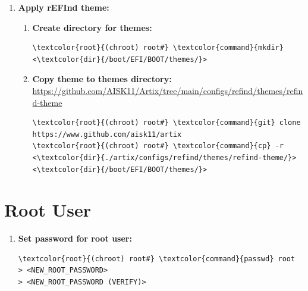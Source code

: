 \documentclass[10pt, a4paper, onecolumn, oneside, titlepage, openany]{book}
\begin{document}
\begin{enumerate}
\begin{Verbatim}[commandchars=\\\{\}]
menuentry "Artix" \{
    #volume  "ESP"
    icon    /EFI/BOOT/themes/refind-theme/icons/128-48/os_artix.png
    loader  /EFI/artix/vmlinuz-linux
    options "initrd=/EFI/artix/intel-ucode.img \char92
    initrd=/EFI/artix/initramfs-linux.img rw root=/dev/mapper/luks-root quiet"
    submenuentry "Debug" \{
        options "initrd=/EFI/artix/intel-ucode.img \char92
        initrd=/EFI/artix/initramfs-linux.img rw root=/dev/mapper/luks-root \char92
        rd.debug"
    \}
    #disabled
\}
\end{Verbatim}
    \item \textbf{Apply rEFInd theme:}
    \begin{enumerate}
        \item \textbf{Create directory for themes:}
\begin{Verbatim}[commandchars=\\\{\}]
\textcolor{root}{(chroot) root#} \textcolor{command}{mkdir} <\textcolor{dir}{/boot/EFI/BOOT/themes/}>
\end{Verbatim}
        \item \textbf{Copy theme to themes directory:}
\newline \url{https://github.com/AISK11/Artix/tree/main/configs/refind/themes/refind-theme}
\begin{Verbatim}[commandchars=\\\{\}]
\textcolor{root}{(chroot) root#} \textcolor{command}{git} clone https://www.github.com/aisk11/artix
\textcolor{root}{(chroot) root#} \textcolor{command}{cp} -r <\textcolor{dir}{./artix/configs/refind/themes/refind-theme/}>
<\textcolor{dir}{/boot/EFI/BOOT/themes/}>
\end{Verbatim}
    \end{enumerate}
\end{enumerate}

\section{Root User}
\begin{enumerate}
    \item \textbf{Set password for root user:}
\begin{Verbatim}[commandchars=\\\{\}]
\textcolor{root}{(chroot) root#} \textcolor{command}{passwd} root
> <NEW_ROOT_PASSWORD>
> <NEW_ROOT_PASSWORD (VERIFY)>
\end{Verbatim}
\end{enumerate}
\end{document}
